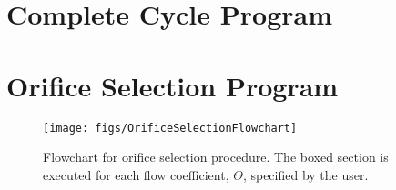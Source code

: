 \section{Complete Cycle Program} \label{sec:MainModel}

\section{Orifice Selection Program} \label{sec:OrifSelect}

\begin{figure}[htbp]
  \centering
  \texttt{[image: figs/OrificeSelectionFlowchart]}
  \caption{Flowchart for orifice selection procedure. 
    The boxed section is executed for each flow coefficient, $\Theta$,
    specified by the user.}
  \label{fig:FlowOrifSelect}
\end{figure}
